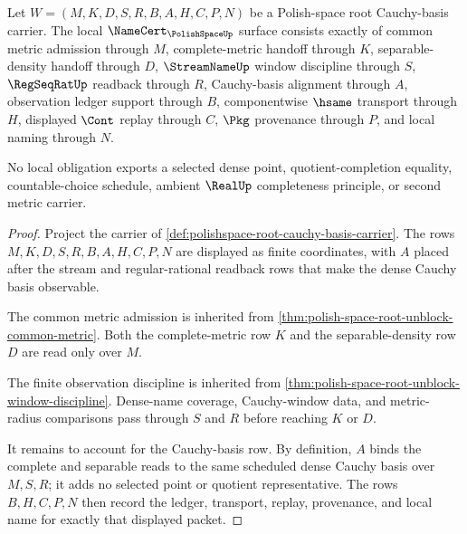 \begin{theorem}
\label{thm:polishspace-root-cauchy-basis-obligations}
Let $W=(M,K,D,S,R,B,A,H,C,P,N)$ be a Polish-space root Cauchy-basis carrier. The local $\NameCert_{\PolishSpaceUp}$ surface consists exactly of common metric admission through $M$, complete-metric handoff through $K$, separable-density handoff through $D$, $\StreamNameUp$ window discipline through $S$, $\RegSeqRatUp$ readback through $R$, Cauchy-basis alignment through $A$, observation ledger support through $B$, componentwise $\hsame$ transport through $H$, displayed $\Cont$ replay through $C$, $\Pkg$ provenance through $P$, and local naming through $N$.

No local obligation exports a selected dense point, quotient-completion equality, countable-choice schedule, ambient $\RealUp$ completeness principle, or second metric carrier.
\end{theorem}
\begin{proof}
Project the carrier of \autoref{def:polishspace-root-cauchy-basis-carrier}. The rows $M,K,D,S,R,B,A,H,C,P,N$ are displayed as finite coordinates, with $A$ placed after the stream and regular-rational readback rows that make the dense Cauchy basis observable.

The common metric admission is inherited from \autoref{thm:polish-space-root-unblock-common-metric}. Both the complete-metric row $K$ and the separable-density row $D$ are read only over $M$.

The finite observation discipline is inherited from \autoref{thm:polish-space-root-unblock-window-discipline}. Dense-name coverage, Cauchy-window data, and metric-radius comparisons pass through $S$ and $R$ before reaching $K$ or $D$.

It remains to account for the Cauchy-basis row. By definition, $A$ binds the complete and separable reads to the same scheduled dense Cauchy basis over $M,S,R$; it adds no selected point or quotient representative. The rows $B,H,C,P,N$ then record the ledger, transport, replay, provenance, and local name for exactly that displayed packet.
\end{proof}

